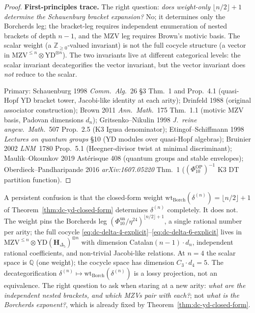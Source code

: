 \begin{proof}
\textbf{First-principles trace.} The right question: \emph{does
weight-only $\lfloor n/2\rfloor+1$ determine the Schauenburg
bracket expansion?} No; it determines only the Borcherds leg;
the bracket-leg requires independent enumeration of nested brackets
of depth $n-1$, and the MZV leg requires Brown's motivic basis.
The scalar weight
(a $\mathbb Z_{\geq 0}$-valued invariant) is not the full cocycle
structure (a vector in $\mathrm{MZV}^{\leq n}\otimes\mathrm{YD}^{\otimes n}$).
The two invariants live at different categorical levels: the scalar
invariant decategorifies the vector invariant, but the vector
invariant does \emph{not} reduce to the scalar.

Primary: Schauenburg 1998 \emph{Comm.\ Alg.}~26 \S 3 Thm.~1 and
Prop.~4.1 (quasi-Hopf YD bracket tower, Jacobi-like identity at each arity);
Drinfeld 1988 (original associator construction);
Brown 2011 \emph{Ann.\ Math.}~175 Thm.~1.1 (motivic MZV basis,
Padovan dimensions $d_n$); Gritsenko--Nikulin 1998 \emph{J.~reine
angew.\ Math.}~507 Prop.~2.5 (K3 Igusa denominator); Etingof--Schiffmann
1998 \emph{Lectures on quantum groups} \S10 (YD modules over
quasi-Hopf algebras); Bruinier 2002 \emph{LNM}~1780 Prop.~5.1
(Heegner-divisor twist at minimal discriminant); Maulik--Okounkov
2019 Ast\'{e}risque 408 (quantum groups and stable envelopes);
Oberdieck--Pandharipande 2016 \emph{arXiv:1607.05220} Thm.~1
($(\Phi_{10}^{\mathrm{OP}})^{-1}$ K3 DT partition function).
\end{proof}

\begin{remark}
\label{rem:dc-yd-weight-vs-structure}
A persistent confusion is that the closed-form weight
$\mathrm{wt}_{\mathrm{Borch}}(\delta^{(n)}) = \lfloor n/2\rfloor + 1$ of
Theorem~\ref{thm:dc-yd-closed-form} determines $\delta^{(n)}$
completely. It does not. The weight pins the Borcherds leg
$(\Phi_{10}^{\mathrm{un}}/\eta^{24})^{\lfloor n/2\rfloor+1}$, a single rational
number per arity; the full cocycle
\eqref{eq:dc-delta-4-explicit}--\eqref{eq:dc-delta-6-explicit} lives
in $\mathrm{MZV}^{\leq n}\otimes\mathrm{YD}(\mathbf H_{\Delta_5})^{\otimes n}$
with dimension Catalan$(n-1)\cdot d_n$, independent rational
coefficients, and non-trivial Jacobi-like relations. At $n = 4$ the
scalar space is $\mathbb Q$ (one weight); the cocycle space has
dimension $C_3\cdot d_4 = 5$. The decategorification
$\delta^{(n)} \mapsto \mathrm{wt}_{\mathrm{Borch}}(\delta^{(n)})$ is a
lossy projection, not an equivalence. The right question to ask when
staring at a new arity: \emph{what are the independent nested brackets,
and which MZVs pair with each?}; not \emph{what is the Borcherds
exponent?}, which is already fixed by Theorem~\ref{thm:dc-yd-closed-form}.
\end{remark}

